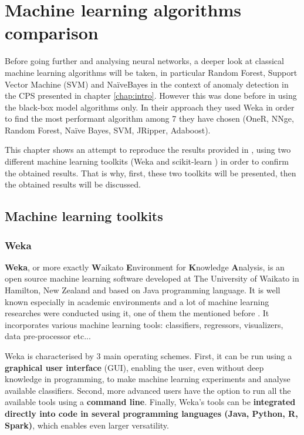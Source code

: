 \chapter{Machine learning algorithms comparison} \label{chap:methods}


Before going further and analysing neural networks, a deeper look at classical machine learning algorithms will be taken, in particular Random Forest, Support Vector Machine (SVM) and NaïveBayes in the context of anomaly detection in the CPS presented in chapter \ref{chap:intro}. However this was done before in \cite{borges_hink_machine_2014-1} using the black-box model algorithms only. In their approach they used Weka \cite{witten_appendix_2017} in order to find the most performant algorithm among 7 they have chosen (OneR, NNge, Random Forest, Naïve Bayes, SVM, JRipper, Adaboost). 

This chapter shows an attempt to reproduce the results provided in \cite{borges_hink_machine_2014-1}, using two different machine learning toolkits (Weka and scikit-learn \cite{pedregosa_scikit-learn_2011}) in order to confirm the obtained results. That is why, first, these two toolkits will be presented, then the obtained results will be discussed.  

\section{Machine learning toolkits}
\subsection{Weka} \label{sec:weka_in_chap:methods}
\textbf{Weka}, or more exactly \textbf{W}aikato \textbf{E}nvironment for \textbf{K}nowledge \textbf{A}nalysis, is an open source machine learning software developed at The University of Waikato in Hamilton, New Zealand and based on Java programming language. It is well known especially in academic environments and a lot of machine learning researches were conducted using it, one of them the mentioned before \cite{borges_hink_machine_2014-1}. It incorporates various machine learning tools: classifiers, regressors, visualizers, data pre-processor etc...

Weka is characterised by 3 main operating schemes. First, it can be run using a \textbf{graphical user interface} (GUI), enabling the user, even without deep knowledge in programming, to make machine learning experiments and analyse available classifiers. Second, more advanced users have the option to run all the available tools using a \textbf{command line}. Finally, Weka's tools can be \textbf{integrated directly into code in several programming languages (Java, Python, R, Spark)}, which enables even larger versatility.

